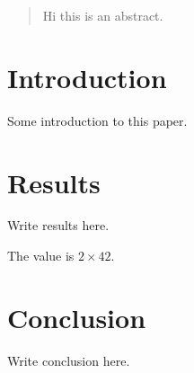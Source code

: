 \documentclass{article}
\begin{document}
\begin{abstract}
Hi this is an abstract.
\end{abstract}

\section{Introduction}

Some introduction to this paper.

\section{Results}

Write results here.

The value is $2 \times 42$.

\section{Conclusion}

Write conclusion here.
\end{document}
